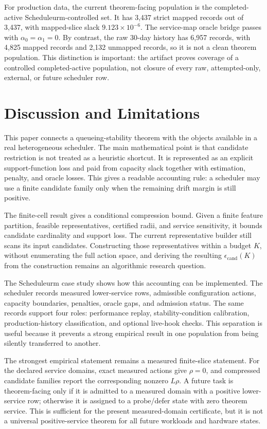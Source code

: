 \documentclass[opre,dblanonrev]{informs4}
\begin{document}
For production data, the current theorem-facing population is the
completed-active Scheduleurm-controlled set.  It has 3,437 strict mapped records
out of 3,437, with mapped-slice slack \(9.123\times10^{-6}\).  The service-map
oracle bridge passes with \(\alpha_0=\alpha_1=0\).  By contrast, the raw 30-day
history has 6,957 records, with 4,825 mapped records and 2,132 unmapped records,
so it is not a clean theorem population.  This distinction is important: the
artifact proves coverage of a controlled completed-active population, not
closure of every raw, attempted-only, external, or future scheduler row.

\section{Discussion and Limitations}
\label{sec:discussion}

This paper connects a queueing-stability theorem with the objects available in
a real heterogeneous scheduler.  The main mathematical point is that candidate
restriction is not treated as a heuristic shortcut.  It is represented as an
explicit support-function loss and paid from capacity slack together with
estimation, penalty, and oracle losses.  This gives a readable accounting rule:
a scheduler may use a finite candidate family only when the remaining drift
margin is still positive.

The finite-cell result gives a conditional compression bound.  Given a finite
feature partition, feasible representatives, certified radii, and service
sensitivity, it bounds candidate cardinality and support loss.  The current
representative builder still scans its input candidates.  Constructing those
representatives within a budget \(K\), without enumerating the full action
space, and deriving the resulting \(\epsilon_{\mathrm{cand}}(K)\) from the
construction remains an algorithmic research question.

The Scheduleurm case study shows how this accounting can be implemented.  The
scheduler records measured lower-service rows, admissible configuration
actions, capacity boundaries, penalties, oracle gaps, and admission status.  The
same records support four roles: performance replay, stability-condition
calibration, production-history classification, and optional live-hook checks.
This separation is useful because it prevents a strong empirical result in one
population from being silently transferred to another.

The strongest empirical statement remains a measured finite-slice statement.
For the declared service domains, exact measured actions give \(\rho=0\), and
compressed candidate families report the corresponding nonzero \(L\rho\).  A
future task is theorem-facing only if it is admitted to a measured domain with a
positive lower-service row; otherwise it is assigned to a probe/defer state with
zero theorem service.  This is sufficient for the present measured-domain
certificate, but it is not a universal positive-service theorem for all future
workloads and hardware states.
\end{document}
